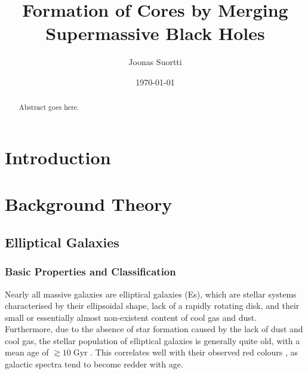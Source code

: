 \documentclass[english, twoside]{HYgradu}
\title{Formation of Cores by Merging Supermassive Black Holes}
\author{Joonas Suortti}
\date{\today}
\begin{document}
\maketitle

\onehalfspacing

\begin{abstract}
Abstract goes here.
\end{abstract}

\mytableofcontents



\chapter{Introduction}

\chapter{Background Theory}

\section{Elliptical Galaxies} \label{section:elliptical}

\subsection{Basic Properties and Classification}

Nearly all massive galaxies are elliptical galaxies (Es), which are stellar systems characterised by their ellipsoidal shape, lack of a rapidly rotating disk, and their small or essentially almost non-existent content of cool gas and dust. Furthermore, due to the absence of star formation caused by the lack of dust and cool gas, the stellar population of elliptical galaxies is generally quite old, with a mean age of $\gtrsim{10} \; \mathrm{Gyr}$ \citep{GalaxyFormationAndEvo2010}. This correlates well with their observed red colours \citep{Cappellari2016}, as galactic spectra tend to become redder with age.
\end{document}
